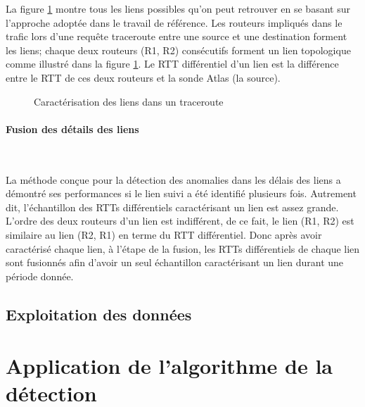  
 La figure \ref{fig:links-inference} montre tous les  liens possibles qu'on peut retrouver en se basant sur l'approche adoptée dans le  travail de référence. Les routeurs impliqués dans le trafic lors d'une requête traceroute entre une  source et une destination forment les liens; chaque deux routeurs (R1, R2) consécutifs forment un lien topologique comme illustré dans la figure \ref{fig:links-inference}. Le RTT différentiel d'un lien est la différence entre le RTT de ces deux routeurs et la sonde Atlas (la source).
 
 
     \begin{landscape}
 	\begin{figure}[H]
 		\centering
 		\resizebox{20cm}{!}{
 			 
 		}
 		\caption{Caractérisation des liens dans un traceroute}
 		\label{fig:links-inference}
 	\end{figure}
 \end{landscape}

  
\paragraph{Fusion des détails des liens}~
 
 La méthode conçue pour la détection des anomalies dans les délais des liens a démontré ses performances si le lien suivi a été identifié plusieurs fois. Autrement dit, l'échantillon des RTTs différentiels caractérisant un lien est assez grande. L'ordre des deux routeurs d'un lien est indifférent, de ce fait, le lien (R1, R2) est similaire au lien (R2, R1) en terme du RTT différentiel. Donc après avoir caractérisé chaque lien, à l'étape de la fusion, les RTTs différentiels de chaque lien sont fusionnés afin d'avoir un seul échantillon caractérisant un lien durant une période donnée.
 
 
\subsection{Exploitation des données}

\section{Application de l'algorithme de la détection}


